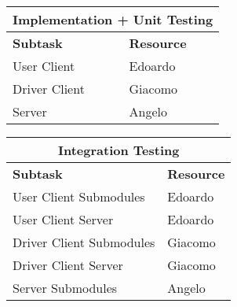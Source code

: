 \vspace* {30px}

\begin{center}
\begin{tabular}{ |l|l| }
	\multicolumn{2}{c}{\textbf{Implementation + Unit Testing}} \\ \hline
	\textbf{Subtask} & \textbf{Resource} \\ \hline
	\multirow{1}{*}{User Client} & Edoardo \\ \hline
	\multirow{1}{*}{Driver Client} & Giacomo \\ \hline
	\multirow{1}{*}{Server} & Angelo \\ \hline

\end{tabular}
\end{center}



\vspace* {30px}

\begin{center}
\begin{tabular}{ |l|l| }
	\multicolumn{2}{c}{\textbf{Integration Testing}} \\ \hline
	\textbf{Subtask} & \textbf{Resource} \\ \hline
	\multirow{1}{*}{User Client Submodules} & Edoardo \\ \hline
	\multirow{1}{*}{User Client \textrightarrow Server} & Edoardo \\ \hline
	\multirow{1}{*}{Driver Client Submodules} & Giacomo \\ \hline
	\multirow{1}{*}{Driver Client \textrightarrow Server} & Giacomo \\ \hline
	\multirow{1}{*}{Server Submodules} & Angelo \\ \hline

\end{tabular}
\end{center}

